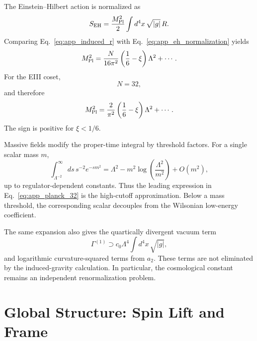 \documentclass[aps,prd,preprint,longbibliography,nofootinbib,superscriptaddress,floatfix]{revtex4-2}
\begin{document}
The Einstein--Hilbert action is normalized as
\begin{equation}
    S_{\rm EH}
    =
    \frac{M_{\rm Pl}^2}{2}
    \int d^4x\,\sqrt{|g|}\,R .
    \label{eq:app_eh_normalization}
\end{equation}
Comparing Eq.~\eqref{eq:app_induced_r} with
Eq.~\eqref{eq:app_eh_normalization} yields
\begin{equation}
    M_{\rm Pl}^2
    =
    \frac{N}{16\pi^2}
    \left(\frac16-\xi\right)\Lambda^2
    +
    \cdots .
    \label{eq:app_planck_n}
\end{equation}
For the EIII coset,
\begin{equation}
    N=32,
    \label{eq:app_n_32}
\end{equation}
and therefore
\begin{equation}
    M_{\rm Pl}^2
    =
    \frac{2}{\pi^2}
    \left(\frac16-\xi\right)\Lambda^2
    +
    \cdots .
    \label{eq:app_planck_32}
\end{equation}
The sign is positive for \(\xi<1/6\).

Massive fields modify the proper-time integral by threshold factors. For a
single scalar mass \(m\),
\begin{equation}
    \int_{\Lambda^{-2}}^\infty ds\,s^{-2}e^{-sm^2}
    =
    \Lambda^2
    -
    m^2\log\left(\frac{\Lambda^2}{m^2}\right)
    +
    O(m^2),
    \label{eq:app_mass_threshold}
\end{equation}
up to regulator-dependent constants. Thus the leading expression in
Eq.~\eqref{eq:app_planck_32} is the high-cutoff approximation. Below a mass
threshold, the corresponding scalar decouples from the Wilsonian low-energy
coefficient.

The same expansion also gives the quartically divergent vacuum term
\begin{equation}
    \Gamma^{(1)}
    \supset
    c_0\Lambda^4
    \int d^4x\,\sqrt{|g|},
    \label{eq:app_vacuum_energy}
\end{equation}
and logarithmic curvature-squared terms from \(a_2\). These terms are not
eliminated by the induced-gravity calculation. In particular, the cosmological
constant remains an independent renormalization problem.


\section{Global Structure: Spin Lift and Frame}
\label{app:global_soldering}
\end{document}
